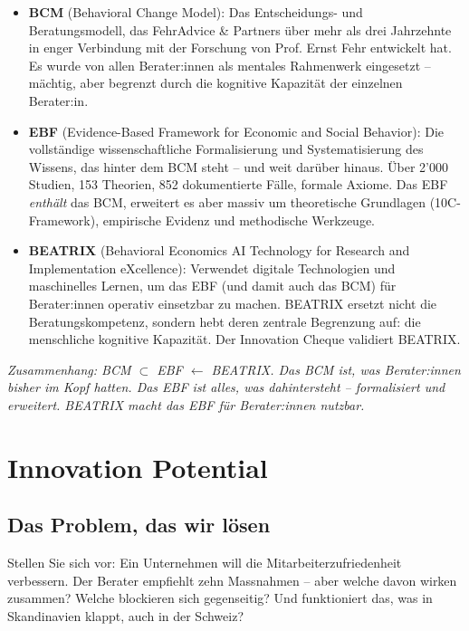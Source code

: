 \documentclass[11pt,a4paper]{article}
\begin{document}
\begin{itemize}[nosep]
    \item \textbf{BCM} (Behavioral Change Model): Das Entscheidungs- und Beratungsmodell, das FehrAdvice \& Partners über mehr als drei Jahrzehnte in enger Verbindung mit der Forschung von Prof. Ernst Fehr entwickelt hat. Es wurde von allen Berater:innen als mentales Rahmenwerk eingesetzt -- mächtig, aber begrenzt durch die kognitive Kapazität der einzelnen Berater:in.
    \item \textbf{EBF} (Evidence-Based Framework for Economic and Social Behavior): Die vollständige wissenschaftliche Formalisierung und Systematisierung des Wissens, das hinter dem BCM steht -- und weit darüber hinaus. Über 2'000 Studien, 153 Theorien, 852 dokumentierte Fälle, formale Axiome. Das EBF \emph{enthält} das BCM, erweitert es aber massiv um theoretische Grundlagen (10C-Framework), empirische Evidenz und methodische Werkzeuge.
    \item \textbf{BEATRIX} (Behavioral Economics AI Technology for Research and Implementation eXcellence): Verwendet digitale Technologien und maschinelles Lernen, um das EBF (und damit auch das BCM) für Berater:innen operativ einsetzbar zu machen. BEATRIX ersetzt nicht die Beratungskompetenz, sondern hebt deren zentrale Begrenzung auf: die menschliche kognitive Kapazität. Der Innovation Cheque validiert BEATRIX.
\end{itemize}

\noindent\textit{Zusammenhang: BCM $\subset$ EBF $\leftarrow$ BEATRIX. Das BCM ist, was Berater:innen bisher im Kopf hatten. Das EBF ist alles, was dahintersteht -- formalisiert und erweitert. BEATRIX macht das EBF für Berater:innen nutzbar.}

\newpage


\section{Innovation Potential}

\subsection{Das Problem, das wir lösen}

Stellen Sie sich vor: Ein Unternehmen will die Mitarbeiterzufriedenheit verbessern. Der Berater empfiehlt zehn Massnahmen -- aber welche davon wirken zusammen? Welche blockieren sich gegenseitig? Und funktioniert das, was in Skandinavien klappt, auch in der Schweiz?
\end{document}
